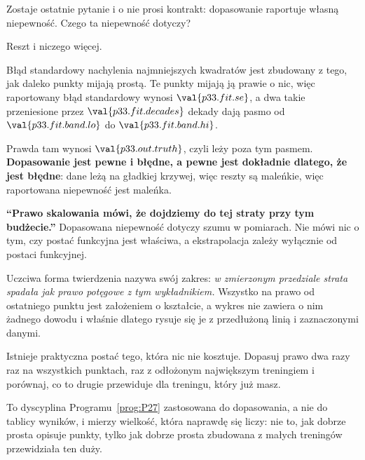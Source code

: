 
\begin{fr}
Zostaje ostatnie pytanie i o nie prosi kontrakt: dopasowanie raportuje własną
niepewność. Czego ta niepewność dotyczy?
\dotline
\nextframe
\end{fr}

\begin{fr}
\begin{ansblock}
Reszt \dash{} i niczego więcej.

Błąd standardowy nachylenia najmniejszych kwadratów jest zbudowany z tego, jak
daleko punkty mijają prostą. Te punkty mijają ją prawie o nic, więc
raportowany błąd standardowy wynosi $\val{p33.fit.se}$, a dwa takie
przeniesione przez $\val{p33.fit.decades}$ dekady dają pasmo od
$\val{p33.fit.band.lo}$ do $\val{p33.fit.band.hi}$.
\end{ansblock}

Prawda tam wynosi $\val{p33.out.truth}$, czyli leży poza tym pasmem.
\textbf{Dopasowanie jest pewne i błędne, a pewne jest dokładnie dlatego, że
jest błędne}: dane leżą na gładkiej krzywej, więc reszty są maleńkie, więc
raportowana niepewność jest maleńka.
\end{fr}

\begin{fr}
\begin{trapbox}
\textbf{\enquote{Prawo skalowania mówi, że dojdziemy do tej straty przy tym
budżecie.}} Dopasowana niepewność dotyczy szumu w pomiarach. Nie mówi nic o
tym, czy postać funkcyjna jest właściwa, a ekstrapolacja zależy wyłącznie od
postaci funkcyjnej.

Uczciwa forma twierdzenia nazywa swój zakres: \emph{w zmierzonym przedziale
strata spadała jak prawo potęgowe z tym wykładnikiem.} Wszystko na prawo od
ostatniego punktu jest założeniem o kształcie, a wykres nie zawiera o nim
żadnego dowodu \dash{} i właśnie dlatego rysuje się je z przedłużoną linią i
zaznaczonymi danymi.
\end{trapbox}
\end{fr}

\begin{fr}
\begin{aibox}
Istnieje praktyczna postać tego, która nic nie kosztuje. Dopasuj prawo dwa
razy \dash{} raz na wszystkich punktach, raz z odłożonym największym
treningiem \dash{} i porównaj, co to drugie przewiduje dla treningu, który już
masz.

To dyscyplina Programu~\ref{prog:P27} zastosowana do dopasowania, a nie do
tablicy wyników, i mierzy wielkość, która naprawdę się liczy: nie to, jak
dobrze prosta opisuje punkty, tylko jak dobrze prosta zbudowana z małych
treningów przewidziała ten duży.
\end{aibox}
\end{fr}

